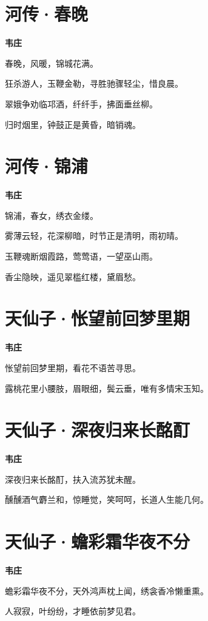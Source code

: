 \documentclass[12pt,a4paper]{ctexbook}
\begin{document}
\section{河传·春晚}
\textbf{韦庄}\par\vspace{0.5em}
春晚，风暖，锦城花满。\par
狂杀游人，玉鞭金勒，寻胜驰骤轻尘，惜良晨。\par
翠娥争劝临邛酒，纤纤手，拂面垂丝柳。\par
归时烟里，钟鼓正是黄昏，暗销魂。\par

\section{河传·锦浦}
\textbf{韦庄}\par\vspace{0.5em}
锦浦，春女，绣衣金缕。\par
雾薄云轻，花深柳暗，时节正是清明，雨初晴。\par
玉鞭魂断烟霞路，莺莺语，一望巫山雨。\par
香尘隐映，遥见翠槛红楼，黛眉愁。\par

\section{天仙子·怅望前回梦里期}
\textbf{韦庄}\par\vspace{0.5em}
怅望前回梦里期，看花不语苦寻思。\par
露桃花里小腰肢，眉眼细，鬓云垂，唯有多情宋玉知。\par

\section{天仙子·深夜归来长酩酊}
\textbf{韦庄}\par\vspace{0.5em}
深夜归来长酩酊，扶入流苏犹未醒。\par
醺醺酒气麝兰和，惊睡觉，笑呵呵，长道人生能几何。\par

\section{天仙子·蟾彩霜华夜不分}
\textbf{韦庄}\par\vspace{0.5em}
蟾彩霜华夜不分，天外鸿声枕上闻，绣衾香冷懒重熏。\par
人寂寂，叶纷纷，才睡依前梦见君。\par
\end{document}
